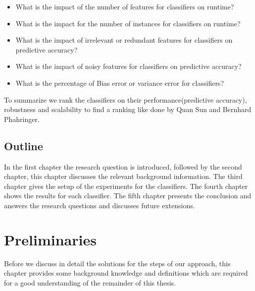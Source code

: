 \documentclass[a4paper,10pt]{article}
\begin{document}

\begin{itemize}
	\item What is the impact of the number of features for classifiers on runtime?
	\item What is the impact for the number of instances for classifiers on runtime?
	\item What is the impact of irrelevant or redundant features for classifiers on predictive accuracy?
	\item What is the impact of noisy features for classifiers on predictive accuracy?
	\item What is the percentage of Bias error or variance error for classifiers?
\end{itemize}

To summarize we rank the classifiers on their performance(predictive accuracy), robustness and scalability to find a ranking like done by Quan Sun and Bernhard Phahringer\cite{ranking}.




\subsection{Outline}
In the first chapter the research question is introduced, followed by the second chapter, this chapter discusses the relevant background information. The third chapter gives the setup of the experiments for the classifiers. The fourth chapter shows the results for each classifier. The fifth chapter presents the conclusion and answers the research questions and discusses future extensions.

\newpage


\section{Preliminaries} \label{Chapter2}
Before we discuss in detail the solutions for the steps of our approach, this chapter provides
some background knowledge and definitions which are required for a good understanding of
the remainder of this thesis.
\end{document}
